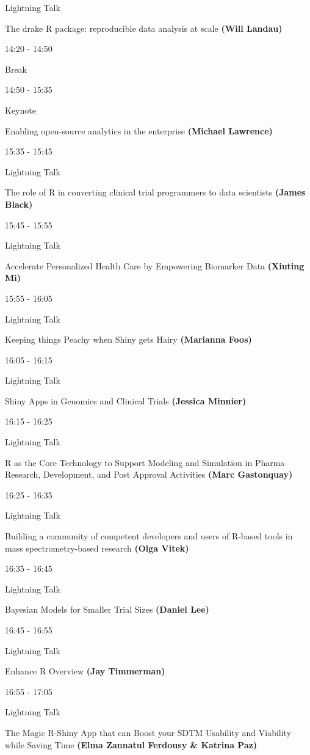 \documentclass[]{book}
\theoremstyle{definition}
\theoremstyle{definition}
\theoremstyle{definition}
\theoremstyle{remark}
\begin{document}
Lightning Talk

The drake R package: reproducible data analysis at scale \textbf{(Will
Landau)}

14:20 - 14:50

Break

14:50 - 15:35

Keynote

Enabling open-source analytics in the enterprise \textbf{(Michael
Lawrence)}

15:35 - 15:45

Lightning Talk

The role of R in converting clinical trial programmers to data
scientists \textbf{(James Black)}

15:45 - 15:55

Lightning Talk

Accelerate Personalized Health Care by Empowering Biomarker Data
\textbf{(Xiuting Mi)}

15:55 - 16:05

Lightning Talk

Keeping things Peachy when Shiny gets Hairy \textbf{(Marianna Foos)}

16:05 - 16:15

Lightning Talk

Shiny Apps in Genomics and Clinical Trials \textbf{(Jessica Minnier)}

16:15 - 16:25

Lightning Talk

R as the Core Technology to Support Modeling and Simulation in Pharma
Research, Development, and Post Approval Activities \textbf{(Marc
Gastonquay)}

16:25 - 16:35

Lightning Talk

Building a community of competent developers and users of R-based tools
in mass spectrometry-based research \textbf{(Olga Vitek)}

16:35 - 16:45

Lightning Talk

Bayesian Models for Smaller Trial Sizes \textbf{(Daniel Lee)}

16:45 - 16:55

Lightning Talk

Enhance R Overview \textbf{(Jay Timmerman)}

16:55 - 17:05

Lightning Talk

The Magic R-Shiny App that can Boost your SDTM Usability and Viability
while Saving Time \textbf{(Elma Zannatul Ferdousy \& Katrina Paz)}
\end{document}
